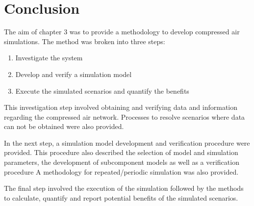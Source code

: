 \section{Conclusion}
The aim of chapter 3 was to provide a methodology to develop compressed air simulations. The method was  broken into three steps:
\begin{enumerate}
	\item Investigate the system
	\item Develop and verify a simulation model
	\item Execute the simulated scenarios and quantify the benefits
\end{enumerate}
This investigation step involved obtaining and verifying data and information regarding the compressed air network. Processes to resolve scenarios where data can not be obtained were also provided.
\par 
In the next step, a simulation model development and verification procedure were provided. This procedure also described the selection of model and simulation parameters, the development of subcomponent models as well as a verification procedure A methodology for repeated/periodic simulation was also provided.
\par 
The final step involved the execution of the simulation followed by the methods to calculate, quantify and report potential benefits of the simulated scenarios.
